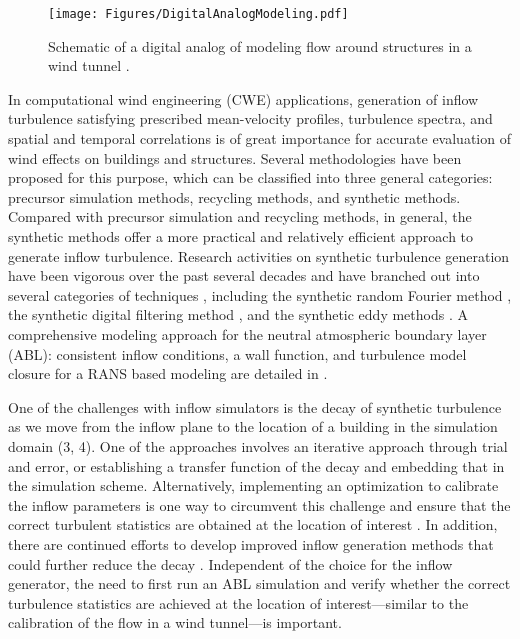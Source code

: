 \begin{figure}[htb]
    \centering
    \texttt{[image: Figures/DigitalAnalogModeling.pdf]}
    \caption{Schematic of a digital analog of modeling flow around structures in a wind tunnel \citep{ding2018aerodynamic}.}
    \label{fig:cfdWind_DAModeling}
\end{figure}

In computational wind engineering (CWE) applications, generation of inflow turbulence satisfying prescribed mean-velocity profiles, turbulence spectra, and spatial and temporal correlations is of great importance for accurate evaluation of wind effects on buildings and structures. Several methodologies have been proposed for this purpose, which can be classified into three general categories: precursor simulation methods, recycling methods, and synthetic methods. Compared with precursor simulation and recycling methods, in general, the synthetic methods offer a more practical and relatively efficient approach to generate inflow turbulence. Research activities on synthetic turbulence generation have been vigorous over the past several decades and have branched out into several categories of techniques \citep{wu2017inflow}, including the synthetic random Fourier method \citep{kraichnan1970diffusion, hoshiya1972simulation}, the synthetic digital filtering method \citep{klein2003digital}, and the synthetic eddy methods \citep{jarrin2006syntheticeddymethod}. A comprehensive modeling approach for the neutral atmospheric boundary layer (ABL): consistent inflow conditions, a wall function, and turbulence model closure for a RANS based modeling are detailed in \citep{parente2011comprehensive}.

One of the challenges with inflow simulators is the decay of synthetic turbulence as we move from the inflow plane to the location of a building in the simulation domain (3, 4). One of the approaches involves an iterative approach through trial and error, or establishing a transfer function of the decay and embedding that in the simulation scheme. Alternatively,  implementing an optimization to calibrate the inflow parameters is one way to circumvent this challenge and ensure that the correct turbulent statistics are obtained at the location of interest \citep{lamberti2018optimizing}. In addition, there are continued efforts to develop improved inflow generation methods that could further reduce the decay  \citep[e.g.,][]{bervida2020synthetic}. Independent of the choice for the inflow generator, the need to first run an ABL simulation and verify whether the correct turbulence statistics are achieved at the location of interest---similar to the calibration of the flow in a wind tunnel---is important.


